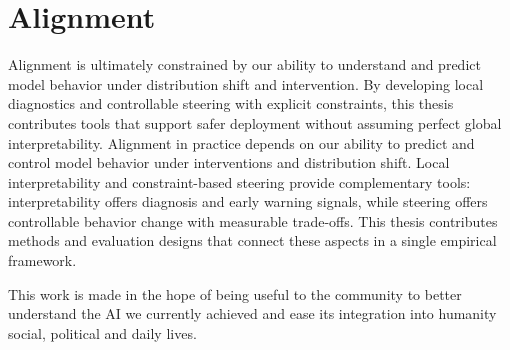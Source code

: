 \documentclass[../infufrgs/ppgc-tese.tex]{subfiles}
\begin{document}
\section{Alignment}
Alignment is ultimately constrained by our ability to understand and predict model behavior under distribution shift and intervention. By developing local diagnostics and controllable steering with explicit constraints, this thesis contributes tools that support safer deployment without assuming perfect global interpretability.
Alignment in practice depends on our ability to predict and control model behavior under interventions and distribution shift. Local interpretability and constraint-based steering provide complementary tools: interpretability offers diagnosis and early warning signals, while steering offers controllable behavior change with measurable trade-offs. This thesis contributes methods and evaluation designs that connect these aspects in a single empirical framework.

This work is made in the hope of being useful to the community to better understand the AI we currently achieved and ease its integration into humanity social, political and daily lives. 
\end{document}
